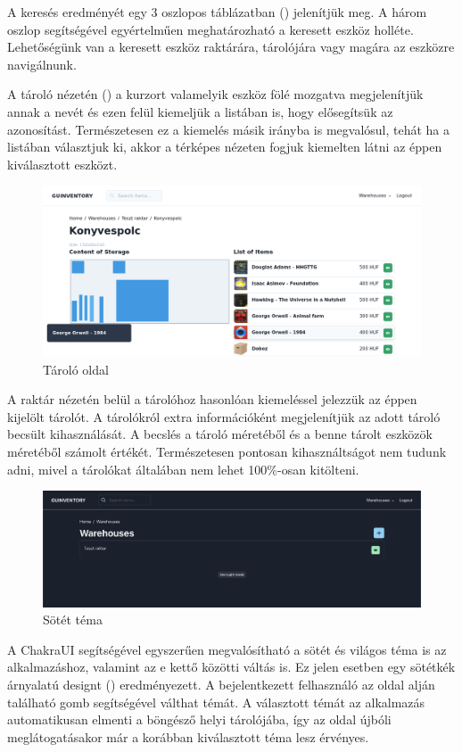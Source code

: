 A keresés eredményét egy 3 oszlopos táblázatban () jelenítjük meg.
A három oszlop segítségével egyértelműen meghatározható a keresett eszköz holléte.
Lehetőségünk van a keresett eszköz raktárára, tárolójára vagy magára az eszközre navigálnunk.

A tároló nézetén () a kurzort valamelyik eszköz fölé mozgatva megjelenítjük annak a nevét és ezen felül kiemeljük a listában is, hogy elősegítsük az azonosítást.
Természetesen ez a kiemelés másik irányba is megvalósul, tehát ha a listában választjuk ki, akkor a térképes nézeten fogjuk kiemelten látni az éppen kiválasztott eszközt.

\begin{figure}[!ht]
  \centering
  \includegraphics[width=150mm, keepaspectratio]{figures/storage.png}
  \caption{Tároló oldal}
  \label{fig:storage}
\end{figure}

A raktár nézetén belül a tárolóhoz hasonlóan kiemeléssel jelezzük az éppen kijelölt tárolót.
A tárolókról extra információként megjelenítjük az adott tároló becsült kihasználását.
A becslés a tároló méretéből és a benne tárolt eszközök méretéből számolt értékét.
Természetesen pontosan kihasználtságot nem tudunk adni, mivel a tárolókat általában nem lehet 100\%-osan kitölteni.

\begin{figure}[!ht]
  \centering
  \includegraphics[width=150mm, keepaspectratio]{figures/dark_mode.png}
  \caption{Sötét téma}
  \label{fig:darkMode}
\end{figure}
A ChakraUI segítségével egyszerűen megvalósítható a sötét és világos téma is az alkalmazáshoz, valamint az e kettő közötti váltás is.
Ez jelen esetben egy sötétkék árnyalatú designt () eredményezett. 
A bejelentkezett felhasználó az oldal alján található gomb segítségével válthat témát.
A választott témát az alkalmazás automatikusan elmenti a böngésző helyi tárolójába, így az oldal újbóli meglátogatásakor már a korábban kiválasztott téma lesz érvényes.


